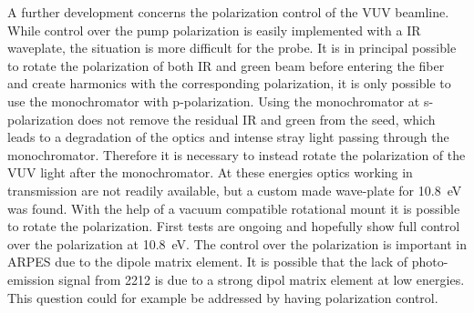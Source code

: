 A further development concerns the polarization control of the VUV beamline.
While control over the pump polarization is easily implemented with a IR waveplate, the situation is more difficult for the probe.
It is in principal possible to rotate the polarization of both IR and green beam before entering the fiber and create harmonics with the corresponding polarization, it is only possible to use the monochromator with p-polarization.
Using the monochromator at s-polarization does not remove the residual IR and green from the seed, which leads to a degradation of the optics and intense stray light passing through the monochromator.
Therefore it is necessary to instead rotate the polarization of the VUV light after the monochromator.
At these energies optics working in transmission are not readily available, but a custom made wave-plate for \qty{10.8}{\electronvolt} was found.
With the help of a vacuum compatible rotational mount it is possible to rotate the polarization.
First tests are ongoing and hopefully show full control over the polarization at \qty{10.8}{\electronvolt}.
The control over the polarization is important in ARPES due to the dipole matrix element.
It is possible that the lack of photo-emission signal from 2212 is due to a strong dipol matrix element at low energies.
This question could for example be addressed by having polarization control.

